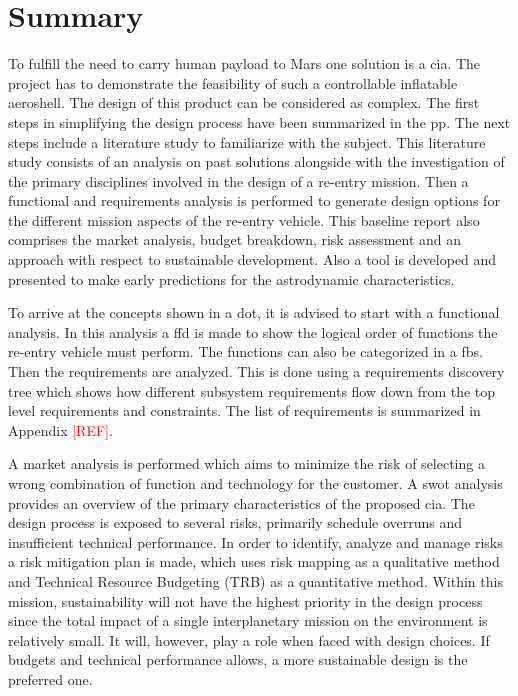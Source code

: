 \section*{Summary}\label{cha:summary}

To fulfill the need to carry human payload to Mars one solution is a \acrfull{cia}. The project has to demonstrate the feasibility of such a controllable inflatable aeroshell. The design of this product can be considered as complex. The first steps in simplifying the design process have been summarized in the \acrfull{pp}. The next steps include a literature study to familiarize with the subject. This literature study consists of an analysis on past solutions alongside with the investigation of the primary disciplines involved in the design of a re-entry mission. Then a functional and requirements analysis is performed to generate design options for the different mission aspects of the re-entry vehicle. This baseline report also comprises the market analysis, budget breakdown, risk assessment and an approach with respect to sustainable development. Also a tool is developed and presented to make early predictions for the astrodynamic characteristics. 

To arrive at the concepts shown in a \acrfull{dot}, it is advised to start with a functional analysis. In this analysis a \acrfull{ffd} is made to show the logical order of functions the re-entry vehicle must perform. The functions can also be categorized in a \acrfull{fbs}. Then the requirements are analyzed. This is done using a requirements discovery tree which shows how different subsystem requirements flow down from the top level requirements and constraints. The list of requirements is summarized in Appendix \textcolor{red}{[REF]}.

A market analysis is performed which aims to minimize the risk of selecting a wrong combination of function and technology for the customer. A \acrfull{swot} analysis provides an overview of the primary characteristics of the proposed \gls{cia}. The design process is exposed to several risks, primarily schedule overruns and insufficient technical performance. In order to identify, analyze and manage risks a risk mitigation plan is made, which uses risk mapping as a qualitative method and Technical Resource Budgeting (TRB) as a quantitative method. Within this mission, sustainability will not have the highest priority in the design process since the total impact of a single interplanetary mission on the environment is relatively small. It will, however, play a role when faced with design choices. If budgets and technical performance allows, a more sustainable design is the preferred one.

